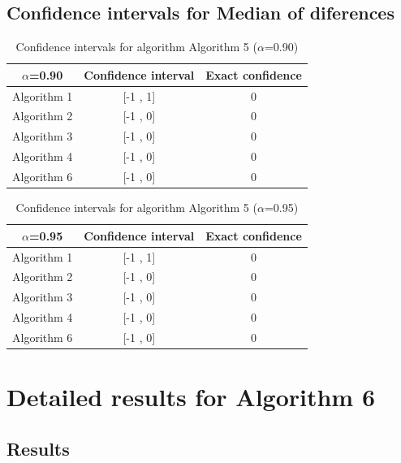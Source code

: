 \documentclass[a4paper,10pt]{article}
\begin{document}
\subsection{Confidence intervals for Median of diferences}

\begin{table}[!htp]
\centering\small
\begin{tabular}{
|c|c|c|}
\hline
 $\alpha$=0.90 & Confidence interval & Exact confidence \\ \hline 
Algorithm 1 & [-1 , 1] & 0\\ \hline 
Algorithm 2 & [-1 , 0] & 0\\ \hline 
Algorithm 3 & [-1 , 0] & 0\\ \hline 
Algorithm 4 & [-1 , 0] & 0\\ \hline 
Algorithm 6 & [-1 , 0] & 0\\ \hline 

\end{tabular}
\caption{Confidence intervals for algorithm Algorithm 5 ($\alpha$=0.90)}
\end{table}
\begin{table}[!htp]
\centering\small
\begin{tabular}{
|c|c|c|}
\hline
 $\alpha$=0.95 & Confidence interval & Exact confidence \\ \hline 
Algorithm 1 & [-1 , 1] & 0\\ \hline 
Algorithm 2 & [-1 , 0] & 0\\ \hline 
Algorithm 3 & [-1 , 0] & 0\\ \hline 
Algorithm 4 & [-1 , 0] & 0\\ \hline 
Algorithm 6 & [-1 , 0] & 0\\ \hline 

\end{tabular}
\caption{Confidence intervals for algorithm Algorithm 5 ($\alpha$=0.95)}
\end{table}

 \clearpage 


\section{Detailed results for Algorithm 6}


\subsection{Results}
\end{document}
